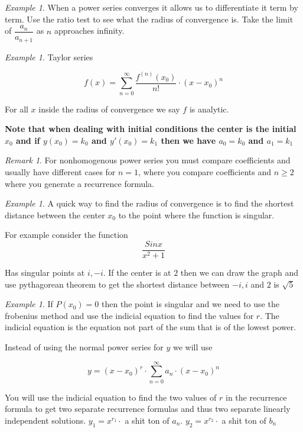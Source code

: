 \documentclass[10pt]{article}
\theoremstyle{definition}
\theoremstyle{remark}
\newtheorem{Rem}[Thm]{Remark}
\newtheorem{Ex}[Thm]{Example}
\theoremstyle{definition}
\begin{document}
\begin{Ex}
When a power series converges it allows us to differentiate it term by term. Use the ratio test to see what the radius of convergence is. Take the limit of $\dfrac{a_n}{a_{n+1}}$ as $n$ approaches infinity. 
\end{Ex}

\begin{Ex}
Taylor series

$$
f(x)=\sum_{n=0}^{\infty} \frac{f^{(n)}(x_0)}{n!} \cdot (x-x_0)^n
$$

For all $x$ inside the radius of convergence we say $f$ is analytic. 

\textbf{Note that when dealing with initial conditions the center is the initial $x_0$ and if $y(x_0)=k_0$ and $y'(x_0)=k_1$ then we have $a_0=k_0$ and $a_1=k_1$}

\end{Ex}

\begin{Rem}
For nonhomogenous power series you must compare coefficients and usually have different cases for $n=1$, where you compare coefficients and $n\ge 2$ where you generate a recurrence formula. 
\end{Rem}

\begin{Ex}
A quick way to find the radius of convergence is to find the shortest distance between the center $x_0$ to the point where the function is singular. 

For example consider the function
$$
\dfrac{Sin x}{x^2+1}
$$

Has singular points at $i,-i$. If the center is at $2$ then we can draw the graph and use pythagorean theorem to get the shortest distance between $-i,i$ and $2$ is $\sqrt{5}$

\end{Ex}

\begin{Ex}
If $P(x_0)=0$ then the point is singular and we need to use the frobenius method and use the indicial equation to find the values for $r$. The indicial equation is the equation not part of the sum that is of the lowest power. 

Instead of using the normal power series for $y$ we will use 

$$
y=(x-x_0)^r \cdot \sum_{n=0}^{\infty} a_n\cdot (x-x_0)^n
$$

You will use the indicial equation to find the two values of $r$ in the recurrence formula to get two separate recurrence formulas and thus two separate linearly independent solutions. $y_1=x^{r_1}\cdot$ a shit ton of $a_n$. $y_2=x^{r_2}\cdot$ a shit ton of $b_n$

\end{Ex}
\end{document}
